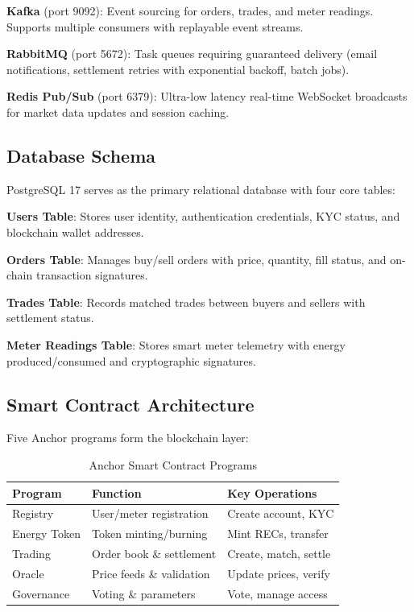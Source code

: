 \documentclass[conference]{IEEEtran}
\begin{document}
\textbf{Kafka} (port 9092): Event sourcing for orders, trades, and meter readings. Supports multiple consumers with replayable event streams.

\textbf{RabbitMQ} (port 5672): Task queues requiring guaranteed delivery (email notifications, settlement retries with exponential backoff, batch jobs).

\textbf{Redis Pub/Sub} (port 6379): Ultra-low latency real-time WebSocket broadcasts for market data updates and session caching.

\subsection{Database Schema}

PostgreSQL 17 serves as the primary relational database with four core tables:

\textbf{Users Table}: Stores user identity, authentication credentials, KYC status, and blockchain wallet addresses.

\textbf{Orders Table}: Manages buy/sell orders with price, quantity, fill status, and on-chain transaction signatures.

\textbf{Trades Table}: Records matched trades between buyers and sellers with settlement status.

\textbf{Meter Readings Table}: Stores smart meter telemetry with energy produced/consumed and cryptographic signatures.

\subsection{Smart Contract Architecture}

Five Anchor programs form the blockchain layer:

\begin{table}[htbp]
\caption{Anchor Smart Contract Programs}
\begin{center}
\begin{tabular}{l l l}
\toprule
\textbf{Program} & \textbf{Function} & \textbf{Key Operations} \\
\midrule
Registry & User/meter registration & Create account, KYC \\
Energy Token & Token minting/burning & Mint RECs, transfer \\
Trading & Order book \& settlement & Create, match, settle \\
Oracle & Price feeds \& validation & Update prices, verify \\
Governance & Voting \& parameters & Vote, manage access \\
\bottomrule
\end{tabular}
\label{tab:programs}
\end{center}
\end{table}
\end{document}
